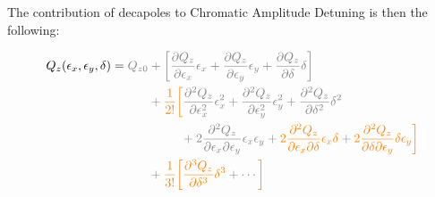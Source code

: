 The contribution of decapoles to Chromatic Amplitude Detuning is then the following:

\begin{equation}
  \begin{aligned}
  Q_z(\epsilon_x, \epsilon_y, \delta) = \color{gray}Q_{z0} &\color{gray}+
                                                  \left[
                                                     \frac{\partial Q_z}{\partial \epsilon_x} \epsilon_x
                                                   + \frac{\partial Q_z}{\partial \epsilon_y} \epsilon_y
                                                   + \frac{\partial Q_z}{\partial \delta} \delta
                                                  \right] \\
                                               &\color{gray}
                                               + \textcolor{orange}{\frac{1}{2!} \biggl[}
                                                     \frac{\partial^2Q_z}{\partial \epsilon_x^2}\epsilon_x^2 
                                                   + \frac{\partial^2Q_z}{\partial \epsilon_y^2}\epsilon_y^2
                                                   + \frac{\partial^2 Q_z}{\partial \delta^2} \delta^2  \\
                                               &\;\begin{aligned}
                                               \phantom{+ \frac{1}{2!} \biggl[}
                                                 & \color{gray}
                                                 + 2 \frac{\partial^2Q_z}{\partial \epsilon_x \partial \epsilon_y}\epsilon_x \epsilon_y
                                                 + \textcolor{orange}{2 \frac{\partial^2Q_z}{\partial \epsilon_x \partial \delta}\epsilon_x \delta}
                                                 + \textcolor{orange}{2 \frac{\partial^2Q_z}{\partial \delta \partial \epsilon_y} \delta \epsilon_y}
                                               \textcolor{orange}{\biggr]} \\
                                               \end{aligned} \\
                                               &\color{gray}+ \textcolor{orange}{\frac{1}{3!}
                                               \biggl[}
                                                    \textcolor{orange}{\frac{\partial^3 Q_z}{\partial \delta^3} \delta^{3}}
                                                    + \cdots \textcolor{orange}{\biggr]}
  \end{aligned}
\end{equation}



